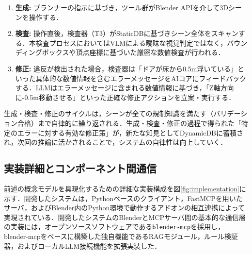 \documentclass[dvipdfmx, a4paper, 9pt]{deimj}
\begin{document}
\begin{enumerate}
  \item \textbf{生成:} プランナーの指示に基づき，ツール群がBlender APIを介して3Dシーンを操作する．
  \item \textbf{検査:} 操作直後，検査器（T3）がStaticDBに基づきシーン全体をスキャンする．本検査プロセスにおいてはVLMによる曖昧な視覚判定ではなく，バウンディングボックスや頂点座標に基づいた厳密な数値検査が行われる．
  \item \textbf{修正:} 違反が検出された場合，検査器は「ドアが床から0.5m浮いている」といった具体的な数値情報を含むエラーメッセージをAIコアにフィードバックする．LLMはエラーメッセージに含まれる数値情報に基づき，「Z軸方向に-0.5m移動させる」といった正確な修正アクションを立案・実行する．
\end{enumerate}

生成・検査・修正のサイクルは，シーンが全ての規制知識を満たす（バリデーション合格）まで自律的に繰り返される．生成・検査・修正の過程で得られた「特定のエラーに対する有効な修正策」が，新たな知見としてDynamicDBに蓄積され，次回の推論に活かされることで，システムの自律性は向上していく．

\subsection{実装詳細とコンポーネント間通信}

前述の概念モデルを具現化するための詳細な実装構成を図\ref{fig:implementation}に示す．開発したシステムは，Pythonベースのクライアント，FastMCPを用いたサーバ，およびBlender内のPython環境で動作するアドオンの相互連携によって実現されている．開発したシステムのBlenderとMCPサーバ間の基本的な通信層の実装には，オープンソースソフトウェアである\texttt{blender-mcp}\cite{ahuja2025blendermcp}を採用し，blender-mcpをベースに構築した独自機能であるRAGモジュール，ルール検証器，およびローカルLLM接続機能を拡張実装した．
\end{document}

